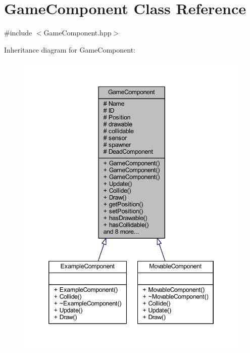 \hypertarget{class_game_component}{\section{Game\-Component Class Reference}
\label{class_game_component}
}


{\ttfamily \#include $<$Game\-Component.\-hpp$>$}



Inheritance diagram for Game\-Component\-:\nopagebreak
\begin{figure}[H]
\begin{center}
\leavevmode
\includegraphics[width=346pt]{class_game_component__inherit__graph}
\end{center}
\end{figure}


